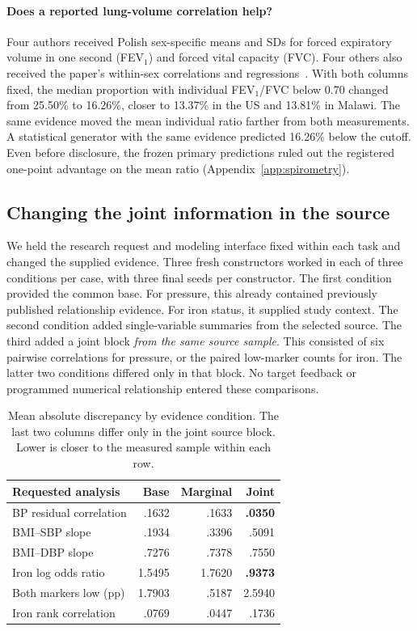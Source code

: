 \documentclass[sigconf,anonymous,review]{acmart}
\begin{document}
\paragraph{Does a reported lung-volume correlation help?}
Four authors received Polish sex-specific means and SDs for forced expiratory volume in one second (FEV$_1$) and forced vital capacity (FVC). Four others also received the paper's within-sex correlations and regressions~\cite{polishspi}. With both columns fixed, the median proportion with individual FEV$_1$/FVC below 0.70 changed from 25.50\% to 16.26\%, closer to 13.37\% in the US and 13.81\% in Malawi. The same evidence moved the mean individual ratio farther from both measurements. A statistical generator with the same evidence predicted 16.26\% below the cutoff. Even before disclosure, the frozen primary predictions ruled out the registered one-point advantage on the mean ratio (Appendix~\ref{app:spirometry}).

\subsection{Changing the joint information in the source}
\label{sec:controlled}
We held the research request and modeling interface fixed within each task and changed the supplied evidence. Three fresh constructors worked in each of three conditions per case, with three final seeds per constructor. The first condition provided the common base. For pressure, this already contained previously published relationship evidence. For iron status, it supplied study context. The second condition added single-variable summaries from the selected source. The third added a joint block \emph{from the same source sample}. This consisted of six pairwise correlations for pressure, or the paired low-marker counts for iron. The latter two conditions differed only in that block. No target feedback or programmed numerical relationship entered these comparisons.

\begin{table}[t]
\caption{Mean absolute discrepancy by evidence condition. The last two columns differ only in the joint source block. Lower is closer to the measured sample within each row.}
\label{tab:evidence}
\centering
\begin{tabular}{@{}lrrr@{}}
\toprule
Requested analysis & Base & Marginal & Joint\\
\midrule
BP residual correlation & .1632 & .1633 & \textbf{.0350}\\
BMI--SBP slope & .1934 & .3396 & .5091\\
BMI--DBP slope & .7276 & .7378 & .7550\\
Iron log odds ratio & 1.5495 & 1.7620 & \textbf{.9373}\\
Both markers low (pp) & 1.7903 & .5187 & 2.5940\\
Iron rank correlation & .0769 & .0447 & .1736\\
\bottomrule
\end{tabular}
\end{table}
\end{document}
